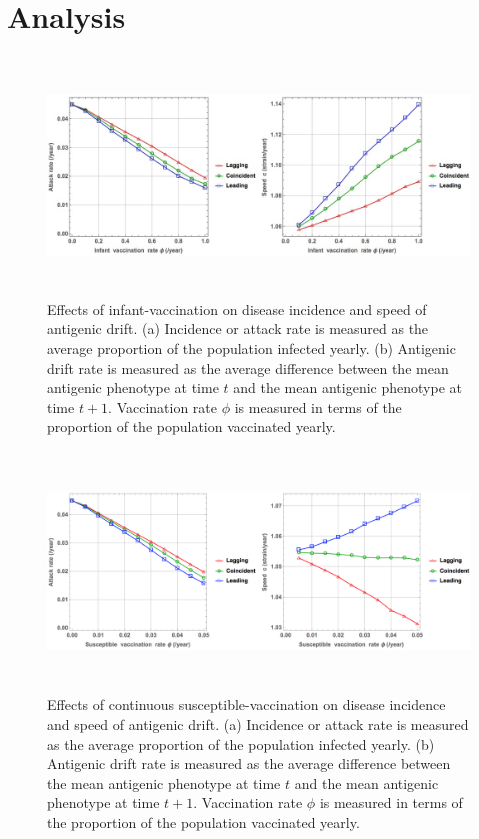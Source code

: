 \documentclass[preprint,12pt]{elsarticle}
\begin{document}
\section{Analysis}
\begin{figure}
  \centering
  \includegraphics[width=6in,height=2.5in]{figures/InfantVcon}
  \caption{Effects of infant-vaccination on disease incidence and speed of antigenic drift. 
  (a) Incidence or attack rate is measured as the average proportion of the population infected yearly.
  (b) Antigenic drift rate is measured as the average difference between the mean antigenic phenotype at time \(t\) and the mean antigenic phenotype at time \(t+1\).
  Vaccination rate \(\phi\) is measured in terms of the proportion of the population vaccinated yearly.
 }
  \label{fig:InfantVcon}
\end{figure}


\begin{figure}
  \centering
  \includegraphics[width=6in,height=2.5in]{figures/SusceptibleVcon}
  \caption{Effects of continuous susceptible-vaccination on disease incidence and speed of antigenic drift. 
  (a) Incidence or attack rate is measured as the average proportion of the population infected yearly.
  (b) Antigenic drift rate is measured as the average difference between the mean antigenic phenotype at time \(t\) and the mean antigenic phenotype at time \(t+1\).
  Vaccination rate \(\phi\) is measured in terms of the proportion of the population vaccinated yearly.
 }
  \label{fig:SusceptibleVcon}
\end{figure}
\end{document}
